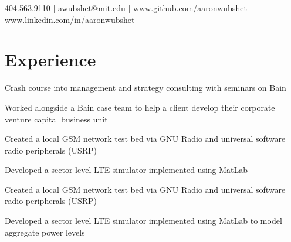 \documentclass[letterpaper, article]{deedy-resume-openfont}
\begin{document}
%
%


{ 404.563.9110 | awubshet@mit.edu | www.github.com/aaronwubshet | www.linkedin.com/in/aaronwubshet}

%
%
\hfill

\begin{minipage}[t]{0.66\textwidth}
\vspace{.01cm}
\section{Experience}

\vspace{\topsep} %
\begin{tightemize}
	\item Crash course into management and strategy consulting with seminars on Bain
	\item Worked alongside a Bain case team to help a client develop their corporate venture capital business unit
\end{tightemize}
\sectionsep

\begin{tightemize}
	\item Created a local GSM network test bed via GNU Radio and universal software radio peripherals (USRP)
	\item Developed a sector level LTE simulator implemented using MatLab
\end{tightemize}
\sectionsep

\begin{tightemize}
	\item Created a local GSM network test bed via GNU Radio and universal software radio peripherals (USRP)
	\item Developed a sector level LTE simulator implemented using MatLab to model aggregate power levels
\end{tightemize}
\sectionsep


\end{minipage}
\end{document}
